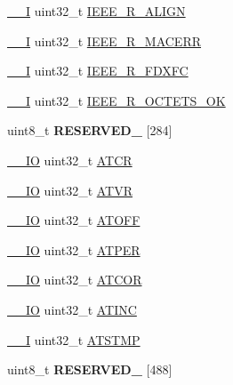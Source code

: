 \begin{DoxyCompactItemize}
\item 
\hyperlink{core__sc300_8h_af63697ed9952cc71e1225efe205f6cd3}{\+\_\+\+\_\+I} uint32\+\_\+t \hyperlink{structENET__Type_a1bf3ce3082a18ca4d39d81628b0c0758}{I\+E\+E\+E\+\_\+\+R\+\_\+\+A\+L\+I\+GN}
\item 
\hyperlink{core__sc300_8h_af63697ed9952cc71e1225efe205f6cd3}{\+\_\+\+\_\+I} uint32\+\_\+t \hyperlink{structENET__Type_abb13d85ca55e430221dfa46d1c7fb11f}{I\+E\+E\+E\+\_\+\+R\+\_\+\+M\+A\+C\+E\+RR}
\item 
\hyperlink{core__sc300_8h_af63697ed9952cc71e1225efe205f6cd3}{\+\_\+\+\_\+I} uint32\+\_\+t \hyperlink{structENET__Type_a2b362535b40637a533d3dc58bec2c41b}{I\+E\+E\+E\+\_\+\+R\+\_\+\+F\+D\+X\+FC}
\item 
\hyperlink{core__sc300_8h_af63697ed9952cc71e1225efe205f6cd3}{\+\_\+\+\_\+I} uint32\+\_\+t \hyperlink{structENET__Type_a00ba779131d741b1b78d4ddbea1349a3}{I\+E\+E\+E\+\_\+\+R\+\_\+\+O\+C\+T\+E\+T\+S\+\_\+\+OK}
\item 
uint8\+\_\+t {\bfseries R\+E\+S\+E\+R\+V\+E\+D\+\_} \mbox{[}284\mbox{]}\hypertarget{structENET__Type_abbf6b62aab34f79d262aa15005117763}{}\label{structENET__Type_abbf6b62aab34f79d262aa15005117763}

\item 
\hyperlink{core__sc300_8h_aec43007d9998a0a0e01faede4133d6be}{\+\_\+\+\_\+\+IO} uint32\+\_\+t \hyperlink{structENET__Type_abeca43c3170448c5b52e3387a18ac9e6}{A\+T\+CR}
\item 
\hyperlink{core__sc300_8h_aec43007d9998a0a0e01faede4133d6be}{\+\_\+\+\_\+\+IO} uint32\+\_\+t \hyperlink{structENET__Type_a3e96f893dbd384b9469847bf08c22e88}{A\+T\+VR}
\item 
\hyperlink{core__sc300_8h_aec43007d9998a0a0e01faede4133d6be}{\+\_\+\+\_\+\+IO} uint32\+\_\+t \hyperlink{structENET__Type_a7d884a3ad9e74534e6543dbb7bc957c5}{A\+T\+O\+FF}
\item 
\hyperlink{core__sc300_8h_aec43007d9998a0a0e01faede4133d6be}{\+\_\+\+\_\+\+IO} uint32\+\_\+t \hyperlink{structENET__Type_a9620a4a827db2cfd586c226a7174fabe}{A\+T\+P\+ER}
\item 
\hyperlink{core__sc300_8h_aec43007d9998a0a0e01faede4133d6be}{\+\_\+\+\_\+\+IO} uint32\+\_\+t \hyperlink{structENET__Type_a659e7687729f9e57fb36b6174eda7a62}{A\+T\+C\+OR}
\item 
\hyperlink{core__sc300_8h_aec43007d9998a0a0e01faede4133d6be}{\+\_\+\+\_\+\+IO} uint32\+\_\+t \hyperlink{structENET__Type_ad73f5b3d70dbf900b7bb783cfe6998c1}{A\+T\+I\+NC}
\item 
\hyperlink{core__sc300_8h_af63697ed9952cc71e1225efe205f6cd3}{\+\_\+\+\_\+I} uint32\+\_\+t \hyperlink{structENET__Type_a5d9cdc2cd314ee0d995cdf374744af6d}{A\+T\+S\+T\+MP}
\item 
uint8\+\_\+t {\bfseries R\+E\+S\+E\+R\+V\+E\+D\+\_} \mbox{[}488\mbox{]}\hypertarget{structENET__Type_ac2d4ccb227223337286f64d76532fcdf}{}\label{structENET__Type_ac2d4ccb227223337286f64d76532fcdf}


\end{DoxyCompactItemize}
